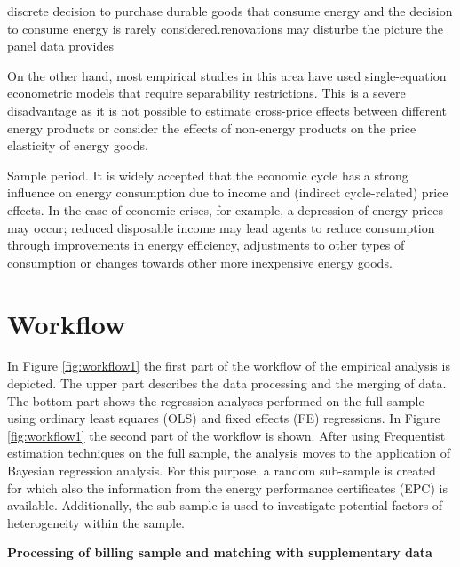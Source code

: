 \documentclass[12pt,twoside]{reedthesis}
\begin{document}
discrete decision to purchase durable goods that consume energy and the decision to consume energy is rarely considered.renovations may disturbe the picture the panel data provides

On the other hand, most empirical studies in this area have used single-equation econometric models that require separability restrictions. This is a severe disadvantage as it is not possible to estimate cross-price effects between different energy products or consider the effects of non-energy products on the price elasticity of energy goods.

Sample period. It is widely accepted that the economic cycle has a strong influence on energy consumption due to income and (indirect cycle-related) price effects. In the case of economic crises, for example, a depression of energy prices may occur; reduced disposable income may lead agents to reduce consumption through improvements in energy efficiency, adjustments to other types of consumption or changes towards other more inexpensive energy goods.

\hypertarget{workflow}{%
\section{Workflow}\label{workflow}}

In Figure \ref{fig:workflow1} the first part of the workflow of the empirical analysis is depicted. The upper part describes the data processing and the merging of data. The bottom part shows the regression analyses performed on the full sample using ordinary least squares (OLS) and fixed effects (FE) regressions. In Figure \ref{fig:workflow1} the second part of the workflow is shown. After using Frequentist estimation techniques on the full sample, the analysis moves to the application of Bayesian regression analysis. For this purpose, a random sub-sample is created for which also the information from the energy performance certificates (EPC) is available. Additionally, the sub-sample is used to investigate potential factors of heterogeneity within the sample.

\textbf{Processing of billing sample and matching with supplementary data}
\end{document}
